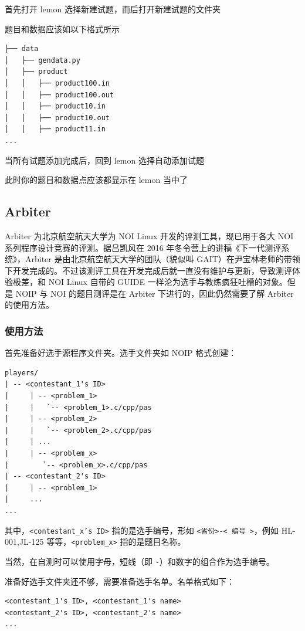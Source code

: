 首先打开 lemon 选择新建试题，而后打开新建试题的文件夹

题目和数据应该如以下格式所示

\begin{verbatim}
├── data
│   ├── gendata.py
│   ├── product
│   │   ├── product100.in
│   │   ├── product100.out
│   │   ├── product10.in
│   │   ├── product10.out
│   │   ├── product11.in
...
\end{verbatim}

当所有试题添加完成后，回到 lemon 选择自动添加试题

此时你的题目和数据点应该都显示在 lemon 当中了

\subsection{Arbiter}

Arbiter 为北京航空航天大学为 NOI Linux 开发的评测工具，现已用于各大 NOI 系列程序设计竞赛的评测。据吕凯风在 2016 年冬令营上的讲稿《下一代测评系统》，Arbiter 是由北京航空航天大学的团队（貌似叫 GAIT）在尹宝林老师的带领下开发完成的。不过该测评工具在开发完成后就一直没有维护与更新，导致测评体验极差，和 NOI Linux 自带的 GUIDE 一样沦为选手与教练疯狂吐槽的对象。但是 NOIP 与 NOI 的题目测评是在 Arbiter 下进行的，因此仍然需要了解 Arbiter 的使用方法。

\subsubsection{使用方法}

首先准备好选手源程序文件夹。选手文件夹如 NOIP 格式创建：

\begin{verbatim}
players/
| -- <contestant_1's ID>
|     | -- <problem_1>
|     |   `-- <problem_1>.c/cpp/pas
|     | -- <problem_2>
|     |   `-- <problem_2>.c/cpp/pas
|     | ...
|     | -- <problem_x>
|        `-- <problem_x>.c/cpp/pas
| -- <contestant_2's ID>
|     | -- <problem_1>
|     ...
...
\end{verbatim}

其中，\texttt{<contestant\_x's ID>} 指的是选手编号，形如 \texttt{<省份>-< 编号 >}，例如 HL-001,JL-125 等等，\texttt{<problem\_x>} 指的是题目名称。

当然，在自测时可以使用字母，短线（即 \texttt{-}）和数字的组合作为选手编号。

准备好选手文件夹还不够，需要准备选手名单。名单格式如下：

\begin{verbatim}
<contestant_1's ID>, <contestant_1's name>
<contestant_2's ID>, <contestant_2's name>
...
\end{verbatim}

